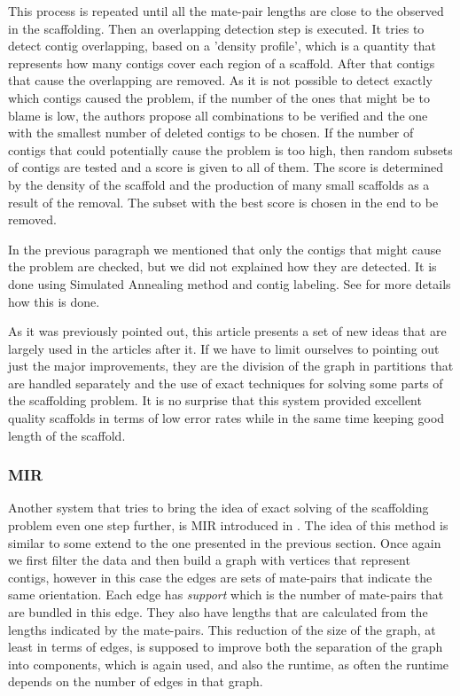 \documentclass[11pt]{article}
\begin{document}
This process is repeated until all the mate-pair lengths are close to the
observed in the scaffolding. Then an overlapping detection step is executed. It
tries to detect contig overlapping, based on a 'density profile', which is a
quantity that represents how many contigs cover each region of a scaffold. After
that contigs that cause the overlapping are removed. As it is not possible to
detect exactly which contigs caused the problem, if the number of the ones that
might be to blame is low, the authors propose all combinations to be verified
and the one with the smallest number of deleted contigs to be chosen. If the
number of contigs that could potentially cause the problem is too high, then
random subsets of contigs are tested and a score is given to all of them. The
score is determined by the density of the scaffold and the production of many
small scaffolds as a result of the removal. The subset with the best score is
chosen in the end to be removed.

In the previous paragraph we mentioned that only the contigs that might cause
the problem are checked, but we did not explained how they are detected. It is
done using Simulated Annealing method and contig labeling. See \cite{SOPRA} for
more details how this is done.

As it was previously pointed out, this article presents a set of new ideas that
are largely used in the articles after it. If we have to limit ourselves to
pointing out just the major improvements, they are the division of the graph in
partitions that are handled separately and the use of exact techniques for
solving some parts of the scaffolding problem. It is no surprise that this
system provided excellent quality scaffolds in terms of low error rates while in
the same time keeping good length of the scaffold.

\subsubsection{MIR} %
\label{ssub:MIR}
Another system that tries to bring the idea of exact solving of the scaffolding
problem even one step further, is MIR introduced in \cite{MIR}. The idea of this
method is similar to some extend to the one presented in the previous section.
Once again we first filter the data and then build a graph with vertices that
represent contigs, however in this case the edges are sets of mate-pairs that
indicate the same orientation. Each edge has \emph{support} which is the number
of mate-pairs that are bundled in this edge. They also have lengths that are
calculated from the lengths indicated by the mate-pairs. This reduction of the
size of the graph, at least in terms of edges, is supposed to improve both the
separation of the graph into components, which is again used, and also the
runtime, as often the runtime depends on the number of edges in that graph.
\end{document}

